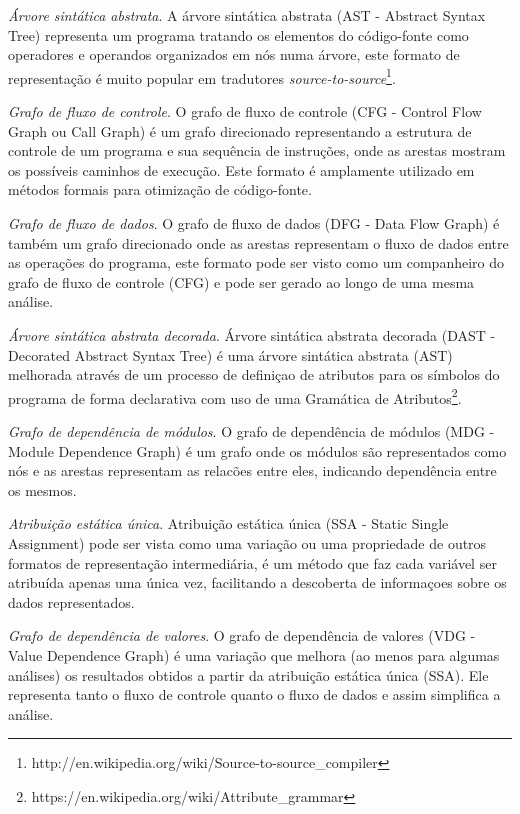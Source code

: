\begin{description}

  \item \textit{Árvore sintática abstrata}.
    A árvore sintática abstrata (AST - Abstract Syntax Tree) representa um
    programa tratando os elementos do código-fonte como operadores e
    operandos organizados em nós numa árvore, este formato de representação é
    muito popular em tradutores {\it
    source-to-source}\footnote{http://en.wikipedia.org/wiki/Source-to-source\_compiler}.

  \item \textit{Grafo de fluxo de controle}.
    O grafo de fluxo de controle (CFG - Control Flow Graph ou Call Graph) é um grafo direcionado
    representando a estrutura de controle de um programa e sua sequência de
    instruções, onde as arestas mostram os possíveis caminhos de execução. Este
    formato é amplamente utilizado em métodos formais para otimização de
    código-fonte.

  \item \textit{Grafo de fluxo de dados}.
    O grafo de fluxo de dados (DFG - Data Flow Graph) é também um grafo
    direcionado onde as arestas representam o fluxo de dados entre as
    operações do programa, este formato pode ser visto como um companheiro do
    grafo de fluxo de controle (CFG) e pode ser gerado ao longo de uma mesma
    análise.

  \item \textit{Árvore sintática abstrata decorada}.
    Árvore sintática abstrata decorada (DAST - Decorated Abstract Syntax Tree) é
    uma árvore sintática abstrata (AST) melhorada através de um processo de
    definiçao de atributos para os símbolos do programa de forma declarativa
    com uso de uma Gramática de
    Atributos\footnote{https://en.wikipedia.org/wiki/Attribute\_grammar}.

  \item \textit{Grafo de dependência de módulos}.
    O grafo de dependência de módulos (MDG - Module Dependence Graph) é um grafo
    onde os módulos são representados como nós e as arestas representam as
    relacões entre eles, indicando dependência entre os mesmos.

  \item \textit{Atribuição estática única}.
    Atribuição estática única (SSA - Static Single Assignment) pode ser vista
    como uma variação ou uma propriedade de outros formatos de representação
    intermediária, é um método que faz cada variável ser atribuída apenas uma única
    vez, facilitando a descoberta de informaçoes sobre os dados representados.

  \item \textit{Grafo de dependência de valores}.
    O grafo de dependência de valores (VDG - Value Dependence Graph) é uma
    variação que melhora (ao menos para algumas análises) os resultados
    obtidos a partir da atribuição estática única (SSA). Ele representa tanto
    o fluxo de controle quanto o fluxo de dados e assim simplifica a análise.

\end{description}

